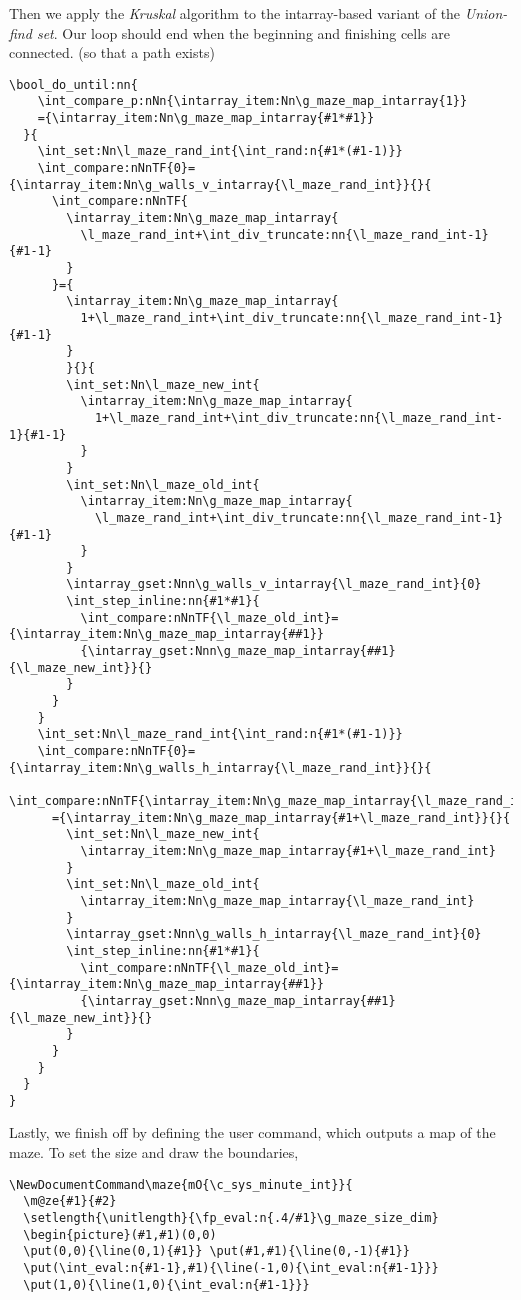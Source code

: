 \documentclass{ltxdoc}
\begin{document}
Then we apply the \textit{Kruskal} algorithm to the intarray-based variant of the \textit{Union-find set}. Our loop should end when the beginning and finishing cells are connected. (so that a path exists)
\begin{lstlisting}[firstnumber=last]
  \bool_do_until:nn{
    \int_compare_p:nNn{\intarray_item:Nn\g_maze_map_intarray{1}}
    ={\intarray_item:Nn\g_maze_map_intarray{#1*#1}}
  }{
    \int_set:Nn\l_maze_rand_int{\int_rand:n{#1*(#1-1)}}
    \int_compare:nNnTF{0}={\intarray_item:Nn\g_walls_v_intarray{\l_maze_rand_int}}{}{
      \int_compare:nNnTF{
        \intarray_item:Nn\g_maze_map_intarray{
          \l_maze_rand_int+\int_div_truncate:nn{\l_maze_rand_int-1}{#1-1}
        }
      }={
        \intarray_item:Nn\g_maze_map_intarray{
          1+\l_maze_rand_int+\int_div_truncate:nn{\l_maze_rand_int-1}{#1-1}
        }
        }{}{
        \int_set:Nn\l_maze_new_int{
          \intarray_item:Nn\g_maze_map_intarray{
            1+\l_maze_rand_int+\int_div_truncate:nn{\l_maze_rand_int-1}{#1-1}
          }
        }
        \int_set:Nn\l_maze_old_int{
          \intarray_item:Nn\g_maze_map_intarray{
            \l_maze_rand_int+\int_div_truncate:nn{\l_maze_rand_int-1}{#1-1}
          }
        }
        \intarray_gset:Nnn\g_walls_v_intarray{\l_maze_rand_int}{0}
        \int_step_inline:nn{#1*#1}{
          \int_compare:nNnTF{\l_maze_old_int}={\intarray_item:Nn\g_maze_map_intarray{##1}}
          {\intarray_gset:Nnn\g_maze_map_intarray{##1}{\l_maze_new_int}}{}
        }
      }
    }
    \int_set:Nn\l_maze_rand_int{\int_rand:n{#1*(#1-1)}}
    \int_compare:nNnTF{0}={\intarray_item:Nn\g_walls_h_intarray{\l_maze_rand_int}}{}{
      \int_compare:nNnTF{\intarray_item:Nn\g_maze_map_intarray{\l_maze_rand_int}}
      ={\intarray_item:Nn\g_maze_map_intarray{#1+\l_maze_rand_int}}{}{
        \int_set:Nn\l_maze_new_int{
          \intarray_item:Nn\g_maze_map_intarray{#1+\l_maze_rand_int}
        }
        \int_set:Nn\l_maze_old_int{
          \intarray_item:Nn\g_maze_map_intarray{\l_maze_rand_int}
        }
        \intarray_gset:Nnn\g_walls_h_intarray{\l_maze_rand_int}{0}
        \int_step_inline:nn{#1*#1}{
          \int_compare:nNnTF{\l_maze_old_int}={\intarray_item:Nn\g_maze_map_intarray{##1}}
          {\intarray_gset:Nnn\g_maze_map_intarray{##1}{\l_maze_new_int}}{}
        }
      }
    }
  }
}
\end{lstlisting}

Lastly, we finish off by defining the user command, which outputs a map of the maze. To set the size and draw the boundaries,
\begin{lstlisting}[firstnumber=last]
\NewDocumentCommand\maze{mO{\c_sys_minute_int}}{
  \m@ze{#1}{#2}
  \setlength{\unitlength}{\fp_eval:n{.4/#1}\g_maze_size_dim}
  \begin{picture}(#1,#1)(0,0)
  \put(0,0){\line(0,1){#1}} \put(#1,#1){\line(0,-1){#1}}
  \put(\int_eval:n{#1-1},#1){\line(-1,0){\int_eval:n{#1-1}}}
  \put(1,0){\line(1,0){\int_eval:n{#1-1}}}
\end{lstlisting}
\end{document}

